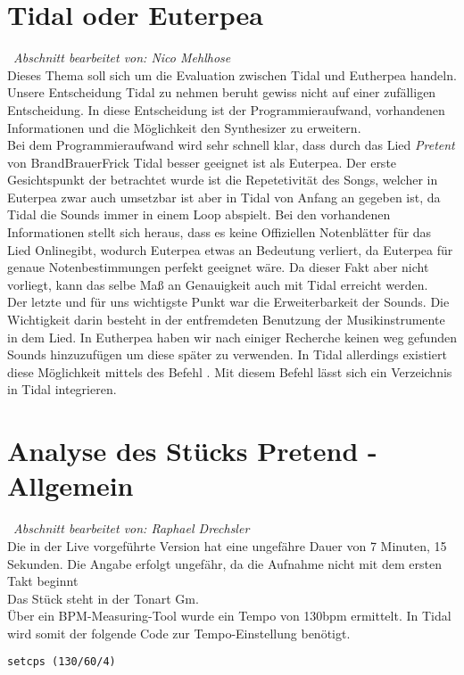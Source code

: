 \documentclass[
10pt, %
a4paper, %
oneside, %
headinclude,footinclude, %
BCOR5mm, %
]{scrartcl}
\begin{document}
\section{Tidal oder Euterpea}\
\textit{Abschnitt bearbeitet von: Nico Mehlhose}\\

\noindent Dieses Thema soll sich um die Evaluation zwischen Tidal und Eutherpea handeln.\\
Unsere Entscheidung Tidal zu nehmen beruht gewiss nicht auf einer zufälligen Entscheidung. In diese Entscheidung ist der Programmieraufwand, vorhandenen Informationen
und die Möglichkeit den Synthesizer zu erweitern.\\
Bei dem Programmieraufwand wird sehr schnell klar, dass durch das Lied \textit{Pretent} von BrandBrauerFrick Tidal besser geeignet ist als Euterpea. Der erste Gesichtspunkt
der betrachtet wurde ist die Repetetivität des Songs, welcher in Euterpea zwar auch umsetzbar ist aber in Tidal von Anfang an gegeben ist, da Tidal die Sounds immer in einem
Loop abspielt. Bei den vorhandenen Informationen stellt sich heraus, dass es keine Offiziellen Notenblätter für das Lied Onlinegibt, wodurch Euterpea etwas an Bedeutung verliert, da Euterpea für genaue Notenbestimmungen perfekt geeignet wäre. Da dieser Fakt aber nicht vorliegt, kann das selbe Maß an Genauigkeit auch mit Tidal erreicht werden.\\
Der letzte und für uns wichtigste Punkt war die Erweiterbarkeit der Sounds. Die Wichtigkeit darin besteht in der entfremdeten Benutzung der Musikinstrumente in dem Lied.
In Eutherpea haben wir nach einiger Recherche keinen weg gefunden Sounds hinzuzufügen um diese später zu verwenden. In Tidal allerdings existiert diese Möglichkeit mittels
des Befehl \textit{}. Mit diesem Befehl lässt sich ein Verzeichnis in Tidal integrieren.
\section{Analyse des Stücks Pretend - Allgemein}\
\textit{Abschnitt bearbeitet von: Raphael Drechsler}\\

\noindent Die in der Live vorgeführte Version \cite{YT1} hat eine ungefähre Dauer von 7 Minuten, 15 Sekunden. Die Angabe erfolgt ungefähr, da die Aufnahme nicht mit dem ersten Takt beginnt\\
Das Stück steht in der Tonart Gm.\\
Über ein BPM-Measuring-Tool \cite{tempo} wurde ein Tempo von 130bpm ermittelt. In Tidal wird somit der folgende Code zur Tempo-Einstellung benötigt. 
\begin{lstlisting}
setcps (130/60/4)
\end{lstlisting}
\end{document}
